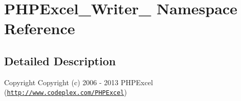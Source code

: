 \hypertarget{namespacePHPExcel__Writer__2007}{}\section{P\+H\+P\+Excel\+\_\+\+Writer\+\_ Namespace Reference}
\label{namespacePHPExcel__Writer__2007}


\subsection{Detailed Description}
\begin{DoxyCopyright}{Copyright}
Copyright (c) 2006 -\/ 2013 P\+H\+P\+Excel (\href{http://www.codeplex.com/PHPExcel}{\tt http\+://www.\+codeplex.\+com/\+P\+H\+P\+Excel}) 
\end{DoxyCopyright}
